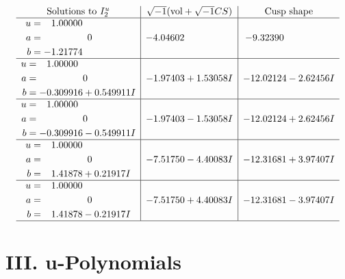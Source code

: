 \documentclass[1p]{elsarticle_modified}
\theoremstyle{definition}
\newcommand{\I}{\sqrt{-1}}
\begin{document}
$$\begin{array}{c|c|c}  
\text{Solutions to }I^u_{2}& \I (\text{vol} + \sqrt{-1}CS) & \text{Cusp shape}\\
 \hline 
\begin{aligned}
u &= \phantom{-}1.00000\phantom{ +0.000000I} \\
a &= \phantom{-0.000000 } 0 \\
b &= -1.21774\phantom{ +0.000000I}\end{aligned}
 & -4.04602\phantom{ +0.000000I} & -9.32390\phantom{ +0.000000I} \\ \hline\begin{aligned}
u &= \phantom{-}1.00000\phantom{ +0.000000I} \\
a &= \phantom{-0.000000 } 0 \\
b &= -0.309916 + 0.549911 I\end{aligned}
 & -1.97403 + 1.53058 I & -12.02124 - 2.62456 I \\ \hline\begin{aligned}
u &= \phantom{-}1.00000\phantom{ +0.000000I} \\
a &= \phantom{-0.000000 } 0 \\
b &= -0.309916 - 0.549911 I\end{aligned}
 & -1.97403 - 1.53058 I & -12.02124 + 2.62456 I \\ \hline\begin{aligned}
u &= \phantom{-}1.00000\phantom{ +0.000000I} \\
a &= \phantom{-0.000000 } 0 \\
b &= \phantom{-}1.41878 + 0.21917 I\end{aligned}
 & -7.51750 - 4.40083 I & -12.31681 + 3.97407 I \\ \hline\begin{aligned}
u &= \phantom{-}1.00000\phantom{ +0.000000I} \\
a &= \phantom{-0.000000 } 0 \\
b &= \phantom{-}1.41878 - 0.21917 I\end{aligned}
 & -7.51750 + 4.40083 I & -12.31681 - 3.97407 I\\
 \hline 
 \end{array}$$\newpage
\newpage\renewcommand{\arraystretch}{1}
\centering \section*{ III. u-Polynomials}
\end{document}
